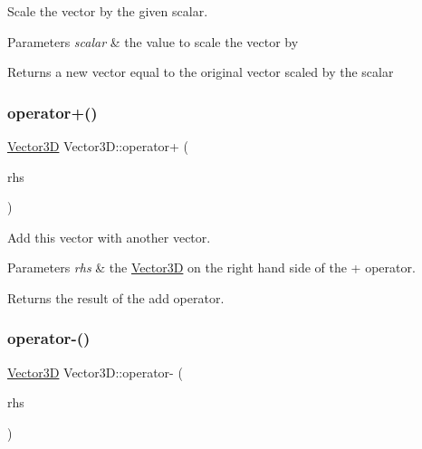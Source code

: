 Scale the vector by the given scalar.


\begin{DoxyParams}{Parameters}
{\em scalar} & the value to scale the vector by \\
\hline
\end{DoxyParams}
\begin{DoxyReturn}{Returns}
a new vector equal to the original vector scaled by the scalar 
\end{DoxyReturn}
\mbox{\label{classVector3D_a9faa0ba77bc84f65fbde301ae4085ee9}} 
\subsubsection{\texorpdfstring{operator+()}{operator+()}}
{\footnotesize\ttfamily \hyperlink{classVector3D}{Vector3D} Vector3\+D\+::operator+ (\begin{DoxyParamCaption}\item[{const \hyperlink{classVector3D}{Vector3D} \&}]{rhs }\end{DoxyParamCaption})}

Add this vector with another vector.


\begin{DoxyParams}{Parameters}
{\em rhs} & the \hyperlink{classVector3D}{Vector3D} on the right hand side of the + operator. \\
\hline
\end{DoxyParams}
\begin{DoxyReturn}{Returns}
the result of the add operator. 
\end{DoxyReturn}
\mbox{\label{classVector3D_ac55913246c9f9d6bc5058e476977e260}} 
\subsubsection{\texorpdfstring{operator-\/()}{operator-()}}
{\footnotesize\ttfamily \hyperlink{classVector3D}{Vector3D} Vector3\+D\+::operator-\/ (\begin{DoxyParamCaption}\item[{const \hyperlink{classVector3D}{Vector3D} \&}]{rhs }\end{DoxyParamCaption})}

